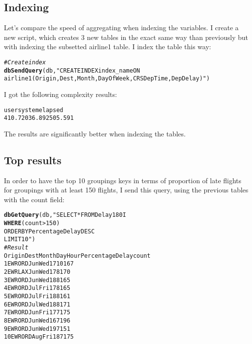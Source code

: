 \documentclass{llncs}\usepackage[]{graphicx}\usepackage[]{color}
\makeatletter
\newcommand{\hlstr}[1]{\textcolor[rgb]{0.192,0.494,0.8}{#1}}%
\newcommand{\hlcom}[1]{\textcolor[rgb]{0.678,0.584,0.686}{\textit{#1}}}%
\newcommand{\hlstd}[1]{\textcolor[rgb]{0.345,0.345,0.345}{#1}}%
\newcommand{\hlkwd}[1]{\textcolor[rgb]{0.737,0.353,0.396}{\textbf{#1}}}%
\newenvironment{kframe}{%
 \def\at@end@of@kframe{}%
 \ifinner\ifhmode%
  \def\at@end@of@kframe{\end{minipage}}%
  \begin{minipage}{\columnwidth}%
 \fi\fi%
 \def\FrameCommand##1{\hskip\@totalleftmargin \hskip-\fboxsep
 \colorbox{shadecolor}{##1}\hskip-\fboxsep
     \hskip-\linewidth \hskip-\@totalleftmargin \hskip\columnwidth}%
 \MakeFramed {\advance\hsize-\width
   \@totalleftmargin\z@ \linewidth\hsize
   \@setminipage}}%
 {\par\unskip\endMakeFramed%
 \at@end@of@kframe}
\newenvironment{knitrout}{}{} %
\makeatother
\begin{document}
\subsection{Indexing}
Let's compare the speed of aggregating when indexing the variables. I create a new script, which creates 3 new tables in the exact same way than previously but with indexing the subsetted airline1 table. I index the table this way:
\begin{knitrout}
\color{fgcolor}\begin{kframe}
\begin{alltt}
\hlcom{# Create index}
\hlkwd{dbSendQuery}\hlstd{(db,}\hlstr{"CREATE INDEX index_name ON 
            airline1 (Origin,Dest,Month,DayOfWeek,CRSDepTime,DepDelay)"}\hlstd{)}
\end{alltt}
\end{kframe}
\end{knitrout}
I got the following complexity results:
\begin{knitrout}
\color{fgcolor}\begin{kframe}
\begin{alltt}
   user  system elapsed 
410.720  36.892 505.591
\end{alltt}
\end{kframe}
\end{knitrout}
The results are significantly better when indexing the tables.

\subsection{Top results}
In order to have the top 10 groupings keys in terms of proportion of late flights for groupings with at least 150 flights, I send this query, using the previous tables with the count field:
\begin{knitrout}
\color{fgcolor}\begin{kframe}
\begin{alltt}
\hlkwd{dbGetQuery}(db,"SELECT * FROM Delay180I 
           \hlkwd{WHERE} (count >150) 
           ORDER BY PercentageDelay DESC 
           LIMIT 10 ")
\hlcom{# Result}
   Origin Dest Month Day Hour PercentageDelay count
1     EWR  ORD   Jun Wed   17              10   167
2     EWR  LAX   Jun Wed   17               8   170
3     EWR  ORD   Jun Wed   18               8   165
4     EWR  ORD   Jul Fri   17               8   165
5     EWR  ORD   Jul Fri   18               8   161
6     EWR  ORD   Jul Wed   18               8   171
7     EWR  ORD   Jun Fri   17               7   175
8     EWR  ORD   Jun Wed   16               7   196
9     EWR  ORD   Jun Wed   19               7   151
10    EWR  ORD   Aug Fri   18               7   175
\end{alltt}
\end{kframe}
\end{knitrout}
\end{document}
